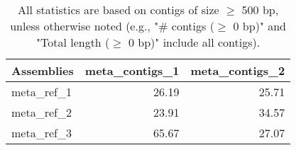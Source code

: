 \documentclass[12pt,a4paper]{article}
\begin{document}
\begin{table}[ht]
\begin{center}
\caption{All statistics are based on contigs of size $\geq$ 500 bp, unless otherwise noted (e.g., "\# contigs ($\geq$ 0 bp)" and "Total length ($\geq$ 0 bp)" include all contigs).}
\begin{tabular}{|l*{2}{|r}|}
\hline
Assemblies & meta\_contigs\_1 & meta\_contigs\_2 \\ \hline
meta\_ref\_1 & 26.19 & 25.71 \\ \hline
meta\_ref\_2 & 23.91 & 34.57 \\ \hline
meta\_ref\_3 & 65.67 & 27.07 \\ \hline
\end{tabular}
\end{center}
\end{table}
\end{document}
